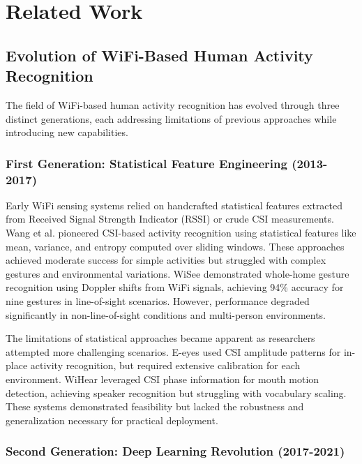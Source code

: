 \documentclass[10pt,journal,compsoc]{IEEEtran}
\begin{document}
\section{Related Work}
\label{sec:related_work}

\subsection{Evolution of WiFi-Based Human Activity Recognition}

The field of WiFi-based human activity recognition has evolved through three distinct generations, each addressing limitations of previous approaches while introducing new capabilities.

\subsubsection{First Generation: Statistical Feature Engineering (2013-2017)}

Early WiFi sensing systems relied on handcrafted statistical features extracted from Received Signal Strength Indicator (RSSI) or crude CSI measurements. Wang et al. \cite{wang2015understanding} pioneered CSI-based activity recognition using statistical features like mean, variance, and entropy computed over sliding windows. These approaches achieved moderate success for simple activities but struggled with complex gestures and environmental variations. WiSee \cite{wisee2013} demonstrated whole-home gesture recognition using Doppler shifts from WiFi signals, achieving 94\% accuracy for nine gestures in line-of-sight scenarios. However, performance degraded significantly in non-line-of-sight conditions and multi-person environments.

The limitations of statistical approaches became apparent as researchers attempted more challenging scenarios. E-eyes \cite{eeyes2014} used CSI amplitude patterns for in-place activity recognition, but required extensive calibration for each environment. WiHear \cite{wihear2014} leveraged CSI phase information for mouth motion detection, achieving speaker recognition but struggling with vocabulary scaling. These systems demonstrated feasibility but lacked the robustness and generalization necessary for practical deployment.

\subsubsection{Second Generation: Deep Learning Revolution (2017-2021)}
\end{document}
